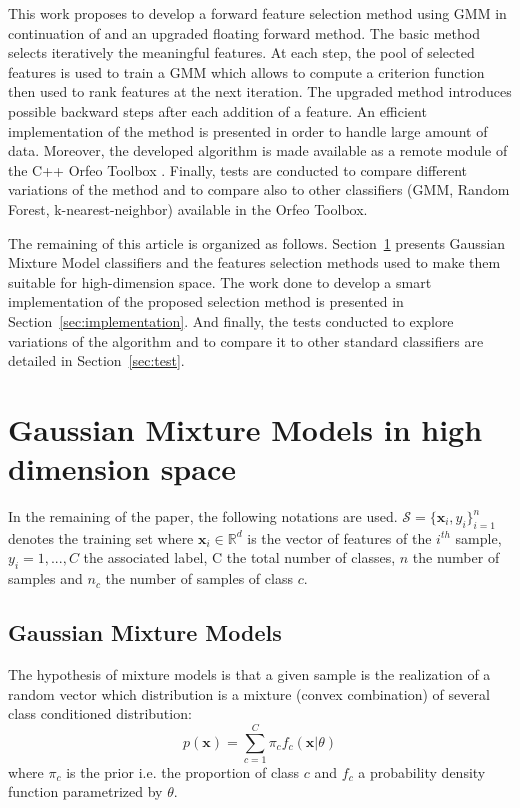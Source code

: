 \documentclass[journal,peerreview,onecolumn]{IEEEtran}
\begin{document}
This work proposes to develop a forward feature selection method using GMM in continuation of \cite{fauvel2015fast} and an upgraded floating forward method. The basic method selects iteratively the meaningful features. At each step, the pool of selected features is used to train a GMM which allows to compute a criterion function then used to rank features at the next iteration. The upgraded method introduces possible backward steps after each addition of a feature. An efficient implementation of the method is presented in order to handle large amount of data. Moreover, the developed algorithm is made available as a remote module of the C++ Orfeo Toolbox \cite{christophe2008orfeo}. Finally, tests are conducted to compare different variations of the method and to compare also to other classifiers (GMM, Random Forest, k-nearest-neighbor) available in the Orfeo Toolbox.

The remaining of this article is organized as follows. Section~\ref{sec:gmm-hd} presents Gaussian Mixture Model classifiers and the features selection methods used to make them suitable for high-dimension space. The work done to develop a smart implementation of the proposed selection method is presented in Section~\ref{sec:implementation}. And finally, the tests conducted to explore variations of the algorithm and to compare it to other standard classifiers are detailed in Section~\ref{sec:test}.

\section{Gaussian Mixture Models in high dimension space}
\label{sec:gmm-hd}

In the remaining of the paper, the following notations are used. $\mathcal{S} = \{\mathbf{x}_i,y_i\}_{i=1}^{n}$ denotes the training set where $\mathbf{x}_i \in \mathbb{R}^d$ is the vector of features of the $i^{th}$ sample, $y_i = 1,...,C$ the associated label, C the total number of classes, $n$ the number of samples and $n_c$ the number of samples of class $c$.

    \subsection{Gaussian Mixture Models}

    The hypothesis of mixture models is that a given sample is the realization of a random vector which distribution is a mixture (convex combination) of several class conditioned distribution:
    \begin{equation}
        p(\mathbf{x}) = \sum_{c=1}^{C} \pi_c f_c(\mathbf{x}|\theta)
    \end{equation}
    where $\pi_c$ is the prior i.e. the proportion of class $c$ and $f_c$ a probability density function parametrized by $\theta$.
\end{document}
